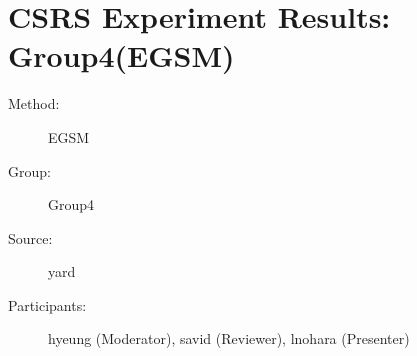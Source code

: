\chapter {CSRS Experiment Results: Group4(EGSM)}
\small

\begin{description}
\item [Method:] EGSM
\item [Group:] Group4
\item [Source:] yard
\item [Participants:] hyeung (Moderator), savid (Reviewer), lnohara (Presenter)
\end{description}
